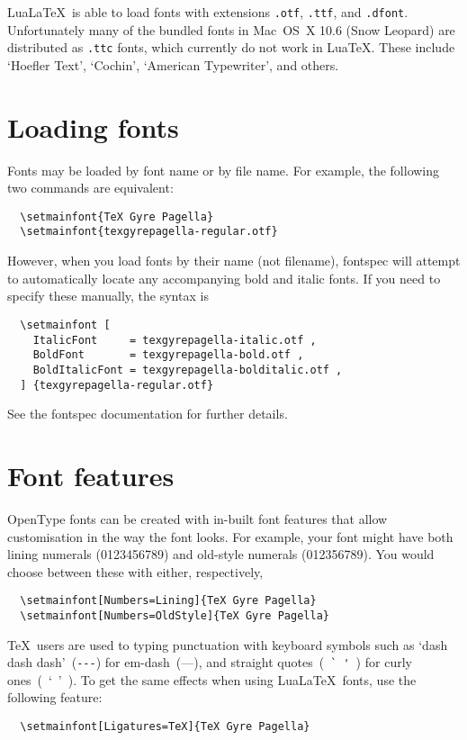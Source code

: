\documentclass{article}
\begin{document}
Lua\LaTeX\ is able to load fonts with extensions \verb|.otf|, \verb|.ttf|, and \verb|.dfont|. Unfortunately many of the bundled fonts in Mac~OS~X 10.6 (Snow Leopard) are distributed as \verb|.ttc| fonts, which currently do not work in Lua\TeX. These include `Hoefler Text', `Cochin', `American Typewriter', and others.

\section{Loading fonts}

Fonts may be loaded by font name or by file name. For example, the following two commands are equivalent:
\begin{verbatim}
  \setmainfont{TeX Gyre Pagella}
  \setmainfont{texgyrepagella-regular.otf}
\end{verbatim}
However, when you load fonts by their name (not filename), \textsf{fontspec} will attempt to automatically locate any accompanying bold and italic fonts. If you need to specify these manually, the syntax is
\begin{verbatim}
  \setmainfont [
    ItalicFont     = texgyrepagella-italic.otf ,
    BoldFont       = texgyrepagella-bold.otf ,
    BoldItalicFont = texgyrepagella-bolditalic.otf ,
  ] {texgyrepagella-regular.otf}
\end{verbatim}
See the \textsf{fontspec} documentation for further details.

\section{Font features}

OpenType fonts can be created with in-built font features that allow customisation in the way the font looks. For example, your font might have both lining numerals ({0123456789}) and old-style numerals ({012356789}). You would choose between these with either, respectively,
\begin{verbatim}
  \setmainfont[Numbers=Lining]{TeX Gyre Pagella}
  \setmainfont[Numbers=OldStyle]{TeX Gyre Pagella}
\end{verbatim}

\TeX\ users are used to typing punctuation with keyboard symbols such as `dash dash dash'~(\verb|---|) for em-dash~(—), and straight quotes~(~\verb|` '|~) for curly ones~(~‘~’~). To get the same effects when using Lua\LaTeX\ fonts, use the following feature:
\begin{verbatim}
  \setmainfont[Ligatures=TeX]{TeX Gyre Pagella}
\end{verbatim}
\end{document}
